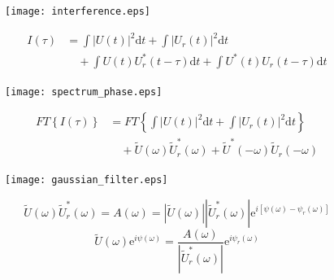 \documentclass[11pt]{beamer}
\begin{document}
\begin{frame}
\begin{figure}
	\centering
	\texttt{[image: interference.eps]}
\end{figure}
\begin{align}
	I(\tau) 	&= \int|U(t)|^2\mathrm{d}t + \int|U_r(t)|^2\mathrm{d}t \nonumber\\
			&\quad + \int U(t)U_r^*(t-\tau)\mathrm{d}t + \int U^*(t)U_r(t-\tau)\mathrm{d}t 
	\label{eq_inter}
\end{align}
\end{frame}

\begin{frame}
\begin{figure}
	\centering
	\texttt{[image: spectrum\_phase.eps]}
\end{figure}
\vspace{-25pt}
\begin{align}
	FT\left\lbrace I(\tau)\right\rbrace 	&= 	FT\left\lbrace \int|U(t)|^2\mathrm{d}t + \int|U_r(t)|^2\mathrm{d}t\right\rbrace \nonumber \\
			&\quad + \tilde{U}(\omega)\tilde{U}_r^*(\omega) + \tilde{U}^*(-\omega)\tilde{U}_r(-\omega)
	\label{eq_fourier}
\end{align}
\end{frame}

\begin{frame}
\begin{figure}
	\centering
	\texttt{[image: gaussian\_filter.eps]}
\end{figure}
\vspace{-25pt}
\begin{equation}
\tilde{U}(\omega)\tilde{U}_r^*(\omega) = A(\omega) = |\tilde{U}(\omega)||\tilde{U}_r^*(\omega)|\mathrm{e}^{i[\psi(\omega)-\psi_r(\omega)]}
	\label{eq_gauss}
\end{equation}
\begin{equation}
\tilde{U}(\omega)\mathrm{e}^{i\psi(\omega)} = \frac{A(\omega)}{|\tilde{U}_r^*(\omega)|}\mathrm{e}^{i\psi_r(\omega)}
	\label{eq_field}
\end{equation}
\end{frame}
\end{document}
